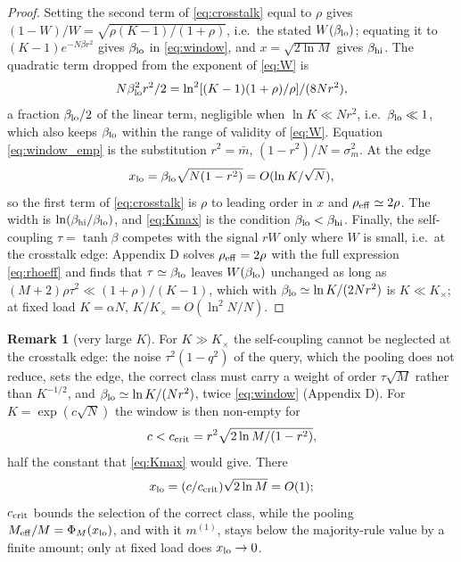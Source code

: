 \documentclass{SciPost}
\theoremstyle{plain}
\theoremstyle{definition}
\newtheorem{remark}{Remark}
\newcommand{\Meff}{M_{\rm eff}}
\begin{document}
\begin{proof}
Setting the second term of \eqref{eq:crosstalk} equal to $\rho$ gives $(1-W)/W=\sqrt{\rho(K-1)/(1+\rho)}$, i.e.\ the stated $W(\beta_{\rm lo})$; equating it to $(K-1)e^{-N\beta r^2}$ gives $\beta_{\rm lo}$ in \eqref{eq:window}, and $x=\sqrt{2\ln M}$ gives $\beta_{\rm hi}$. The quadratic term dropped from the exponent of \eqref{eq:W} is
\begin{equation*}
N\beta_{\rm lo}^2r^2/2=\ln^2[(K-1)(1+\rho)/\rho]/(8Nr^2),
\end{equation*}
a fraction $\beta_{\rm lo}/2$ of the linear term, negligible when $\ln K\ll Nr^2$, i.e.\ $\beta_{\rm lo}\ll1$, which also keeps $\beta_{\rm lo}$ within the range of validity of \eqref{eq:W}. Equation \eqref{eq:window_emp} is the substitution $r^2=\bar m$, $(1-r^2)/N=\sigma_m^2$. At the edge
\begin{equation*}
x_{\rm lo}=\beta_{\rm lo}\sqrt{N(1-r^2)}=O(\ln K/\sqrt N),
\end{equation*}
so the first term of \eqref{eq:crosstalk} is $\rho$ to leading order in $x$ and $\rho_{\rm eff}\simeq2\rho$. The width is $\ln(\beta_{\rm hi}/\beta_{\rm lo})$, and \eqref{eq:Kmax} is the condition $\beta_{\rm lo}<\beta_{\rm hi}$. Finally, the self-coupling $\tau=\tanh\beta$ competes with the signal $rW$ only where $W$ is small, i.e.\ at the crosstalk edge: Appendix D solves $\rho_{\rm eff}=2\rho$ with the full expression \eqref{eq:rhoeff} and finds that $\tau\simeq\beta_{\rm lo}$ leaves $W(\beta_{\rm lo})$ unchanged as long as $(M+2)\rho\tau^2\ll(1+\rho)/(K-1)$, which with $\beta_{\rm lo}\simeq\ln K/(2Nr^2)$ is $K\ll K_\times$; at fixed load $K=\alpha N$, $K/K_\times=O(\ln^2N/N)$.
\end{proof}

\begin{remark}[very large $K$]\label{rem:largeK}
For $K\gg K_\times$ the self-coupling cannot be neglected at the crosstalk edge: the noise $\tau^2(1-q^2)$ of the query, which the pooling does not reduce, sets the edge, the correct class must carry a weight of order $\tau\sqrt M$ rather than $K^{-1/2}$, and $\beta_{\rm lo}\simeq\ln K/(Nr^2)$, twice \eqref{eq:window} (Appendix D). For $K=\exp(c\sqrt N)$ the window is then non-empty for
\begin{equation*}
c<c_{\rm crit}=r^2\sqrt{2\ln M/(1-r^2)},
\end{equation*}
half the constant that \eqref{eq:Kmax} would give. There
\begin{equation*}
x_{\rm lo}=(c/c_{\rm crit})\sqrt{2\ln M}=O(1);
\end{equation*}
$c_{\rm crit}$ bounds the selection of the correct class, while the pooling $\Meff/M=\Phi_M(x_{\rm lo})$, and with it $m^{(1)}$, stays below the majority-rule value by a finite amount; only at fixed load does $x_{\rm lo}\to0$.
\end{remark}
\end{document}
